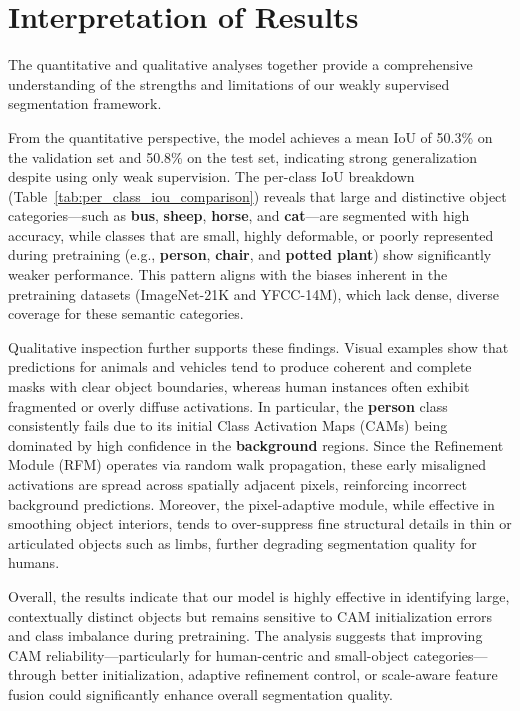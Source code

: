 
\section{Interpretation of Results}
\label{sec:interpretation_of_results}
The quantitative and qualitative analyses together provide a comprehensive understanding of the strengths and limitations of our weakly supervised segmentation framework.

From the quantitative perspective, the model achieves a mean IoU of 50.3\% on the validation set and 50.8\% on the test set, indicating strong generalization despite using only weak supervision. The per-class IoU breakdown (Table~\ref{tab:per_class_iou_comparison}) reveals that large and distinctive object categories—such as \textbf{bus}, \textbf{sheep}, \textbf{horse}, and \textbf{cat}—are segmented with high accuracy, while classes that are small, highly deformable, or poorly represented during pretraining (e.g., \textbf{person}, \textbf{chair}, and \textbf{potted plant}) show significantly weaker performance. This pattern aligns with the biases inherent in the pretraining datasets (ImageNet-21K and YFCC-14M), which lack dense, diverse coverage for these semantic categories.

Qualitative inspection further supports these findings. Visual examples show that predictions for animals and vehicles tend to produce coherent and complete masks with clear object boundaries, whereas human instances often exhibit fragmented or overly diffuse activations. In particular, the \textbf{person} class consistently fails due to its initial Class Activation Maps (CAMs) being dominated by high confidence in the \textbf{background} regions. Since the Refinement Module (RFM) operates via random walk propagation, these early misaligned activations are spread across spatially adjacent pixels, reinforcing incorrect background predictions. Moreover, the pixel-adaptive module, while effective in smoothing object interiors, tends to over-suppress fine structural details in thin or articulated objects such as limbs, further degrading segmentation quality for humans.

Overall, the results indicate that our model is highly effective in identifying large, contextually distinct objects but remains sensitive to CAM initialization errors and class imbalance during pretraining. The analysis suggests that improving CAM reliability—particularly for human-centric and small-object categories—through better initialization, adaptive refinement control, or scale-aware feature fusion could significantly enhance overall segmentation quality.